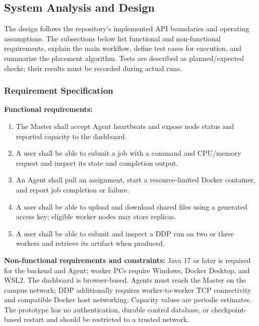 \documentclass{article}
\begin{document}
	\subsection{System Analysis and Design}
The design follows the repository's implemented API boundaries and operating assumptions. The subsections below list functional and non-functional requirements, explain the main workflow, define test cases for execution, and summarize the placement algorithm. Tests are described as planned/expected checks; their results must be recorded during actual runs.
	\subsubsection{Requirement Specification}
\textbf{Functional requirements:}
\begin{enumerate}
  \item The Master shall accept Agent heartbeats and expose node status and reported capacity to the dashboard.
  \item A user shall be able to submit a job with a command and CPU/memory request and inspect its state and completion output.
  \item An Agent shall pull an assignment, start a resource-limited Docker container, and report job completion or failure.
  \item A user shall be able to upload and download shared files using a generated access key; eligible worker nodes may store replicas.
  \item A user shall be able to submit and inspect a DDP run on two or three workers and retrieve its artifact when produced.
\end{enumerate}
\textbf{Non-functional requirements and constraints:} Java 17 or later is required for the backend and Agent; worker PCs require Windows, Docker Desktop, and WSL2. The dashboard is browser-based. Agents must reach the Master on the campus network; DDP additionally requires worker-to-worker TCP connectivity and compatible Docker host networking. Capacity values are periodic estimates. The prototype has no authentication, durable control database, or checkpoint-based restart and should be restricted to a trusted network.
\end{document}
